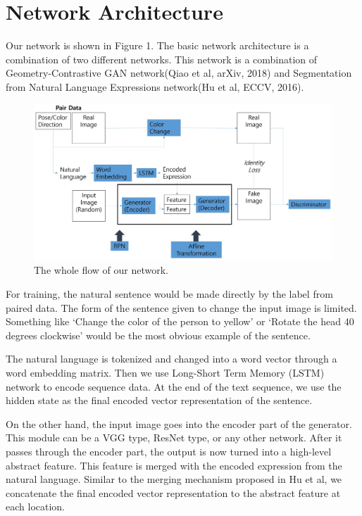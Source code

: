 \documentclass[10pt,twocolumn,letterpaper]{article}
\begin{document}
\section{Network Architecture}
 Our network is shown in Figure 1. The basic network architecture is a combination of two different networks. This network is a combination of Geometry-Contrastive GAN network(Qiao et al, arXiv, 2018) and Segmentation from Natural Language Expressions network(Hu et al, ECCV, 2016).
\begin{figure}
\begin{center}
\includegraphics [scale=0.3] {images/network.JPG}
\end{center}
  \caption{The whole flow of our network. }
\label{fig:short}
\end{figure}

For training, the natural sentence would be made directly by the label from paired data. The form of the sentence given to change the input image is limited. Something like ‘Change the color of the person to yellow’ or  ‘Rotate the head 40 degrees clockwise’ would be the most obvious example of the sentence.

The natural language is tokenized and changed into a word vector through a word embedding matrix. Then we use Long-Short Term Memory (LSTM) network to encode sequence data. At the end of the text sequence, we use the hidden state as the final encoded vector representation of the sentence.

On the other hand, the input image goes into the encoder part of the generator. This module can be a VGG type, ResNet type, or any other network. After it passes through the encoder part, the output is now turned into a high-level abstract feature. This feature is merged with the encoded expression from the natural language. Similar to the merging mechanism proposed in Hu et al, we concatenate the final encoded vector representation to the abstract feature at each location.
\end{document}
